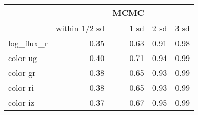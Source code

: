 \begin{tabular}{lrrrr}
{} &  &  \textbf{MCMC} &  & \\
\toprule
{} & within 1/2 sd & 1 sd & 2 sd & 3 sd \\
\midrule
log\_flux\_r &          0.35 & 0.63 & 0.91 & 0.98 \\
color ug   &          0.40 & 0.71 & 0.94 & 0.99 \\
color gr   &          0.38 & 0.65 & 0.93 & 0.99 \\
color ri   &          0.38 & 0.65 & 0.93 & 0.99 \\
color iz   &          0.37 & 0.67 & 0.95 & 0.99 \\
\bottomrule
\end{tabular}
